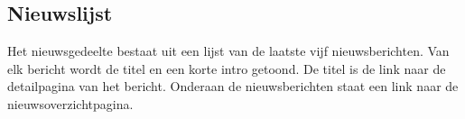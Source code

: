 \subsection{Nieuwslijst}
\label{sec:nieuwslijst}
Het nieuwsgedeelte bestaat uit een lijst van de laatste vijf nieuwsberichten. Van elk bericht wordt de titel en een korte intro getoond. De titel is de link naar de detailpagina van het bericht. Onderaan de nieuwsberichten staat een link naar de nieuwsoverzichtpagina. 